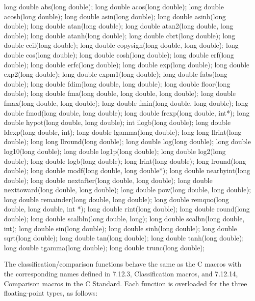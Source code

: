 \begin{codeblock}
long double abs(long double);
long double acos(long double);
long double acosh(long double);
long double asin(long double);
long double asinh(long double);
long double atan(long double);
long double atan2(long double, long double);
long double atanh(long double);
long double cbrt(long double);
long double ceil(long double);
long double copysign(long double, long double);
long double cos(long double);
long double cosh(long double);
long double erf(long double);
long double erfc(long double);
long double exp(long double);
long double exp2(long double);
long double expm1(long double);
long double fabs(long double);
long double fdim(long double, long double);
long double floor(long double);
long double fma(long double, long double, long double);
long double fmax(long double, long double);
long double fmin(long double, long double);
long double fmod(long double, long double);
long double frexp(long double, int*);
long double hypot(long double, long double);
int ilogb(long double);
long double ldexp(long double, int);
long double lgamma(long double);
long long llrint(long double);
long long llround(long double);
long double log(long double);
long double log10(long double);
long double log1p(long double);
long double log2(long double);
long double logb(long double);
long lrint(long double);
long lround(long double);
long double modf(long double, long double*);
long double nearbyint(long double);
long double nextafter(long double, long double);
long double nexttoward(long double, long double);
long double pow(long double, long double);
long double remainder(long double, long double);
long double remquo(long double, long double, int *);
long double rint(long double);
long double round(long double);
long double scalbln(long double, long);
long double scalbn(long double, int);
long double sin(long double);
long double sinh(long double);
long double sqrt(long double);
long double tan(long double);
long double tanh(long double);
long double tgamma(long double);
long double trunc(long double);
\end{codeblock}

\pnum
The classification/comparison functions behave the same as the C macros with the
corresponding names defined in 7.12.3, Classification macros, and 7.12.14, Comparison
macros in the C Standard. Each function is overloaded for the three floating-point
types, as follows:

